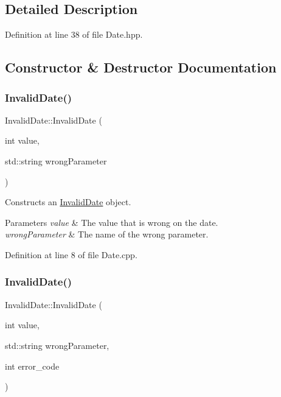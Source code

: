 \subsection{Detailed Description}


Definition at line 38 of file Date.\+hpp.



\subsection{Constructor \& Destructor Documentation}
\mbox{\label{classInvalidDate_aec0b6360cdfe3c61278ac5ff668dc946}} 
\subsubsection{\texorpdfstring{Invalid\+Date()}{InvalidDate()}\hspace{0.1cm}{\footnotesize\ttfamily [1/2]}}
{\footnotesize\ttfamily Invalid\+Date\+::\+Invalid\+Date (\begin{DoxyParamCaption}\item[{int}]{value,  }\item[{std\+::string}]{wrong\+Parameter }\end{DoxyParamCaption})}

Constructs an \hyperlink{classInvalidDate}{Invalid\+Date} object. 
\begin{DoxyParams}{Parameters}
{\em value} & The value that is wrong on the date. \\
\hline
{\em wrong\+Parameter} & The name of the wrong parameter. \\
\hline
\end{DoxyParams}


Definition at line 8 of file Date.\+cpp.

\mbox{\label{classInvalidDate_acd3b0f4629f51807bd95a7530642d8f3}} 
\subsubsection{\texorpdfstring{Invalid\+Date()}{InvalidDate()}\hspace{0.1cm}{\footnotesize\ttfamily [2/2]}}
{\footnotesize\ttfamily Invalid\+Date\+::\+Invalid\+Date (\begin{DoxyParamCaption}\item[{int}]{value,  }\item[{std\+::string}]{wrong\+Parameter,  }\item[{int}]{error\+\_\+code }\end{DoxyParamCaption})}

